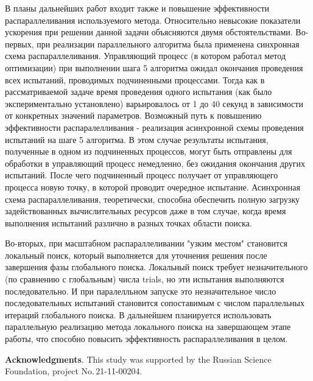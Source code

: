 \documentclass{svproc}
\begin{document}
В планы дальнейших работ входит также и повышение эффективности распараллеливания используемого метода. Относительно невысокие показатели ускорения при решении данной задачи объясняются двумя обстоятельствами. Во-первых, при реализации параллельного алгоритма была применена синхронная схема распараллеливания. Управляющий процесс (в котором работал метод оптимизации) при выполнении  шага 5 алгоритма ожидал окончания проведения всех испытаний, проводимых подчиненными процессами. Тогда как в рассматриваемой задаче время проведения одного испытания (как было экспериментально установлено) варьировалось от 1 до 40 секунд в зависимости от конкретных значений параметров. Возможный путь к повышению эффективности распаралелливания - реализация асинхронной схемы проведения испытаний на шаге 5 алгоритма. 
В этом случае результаты испытания, полученные в одном из подчиненных процессов, могут быть отправлены для обработки в управляющий процесс немедленно, без ожидания окончания других испытаний. После чего подчиненный процесс получает от управляющего процесса новую точку, в которой проводит очередное испытание. Асинхронная схема распараллеливания, теоретически, способна обеспечить полную загрузку задействованных вычислительных ресурсов даже в том случае, когда время выполнения испытаний различно в разных точках области поиска. 

Во-вторых, при масштабном распараллеливании "узким местом" становится локальный поиск, который выполняется для уточнения решения после завершения фазы глобального поиска. Локальный поиск требует незначительного (по сравнению с глобальным) числа trials, но эти испытания выполняются последовательно. И при паралелльном запуске это незначительное число последовательных испытаний становится сопоставимым с числом параллельных итераций глобального поиска. 
В дальнейшем планируется использовать параллельную реализацию метода локального поиска на завершающем этапе работы, что способно повысить эффективность распараллеливания в целом.



\medskip

\textbf{Acknowledgments}. This study was supported by the Russian Science Foundation, project No.\,21-11-00204.

%
%

{}
\end{document}
